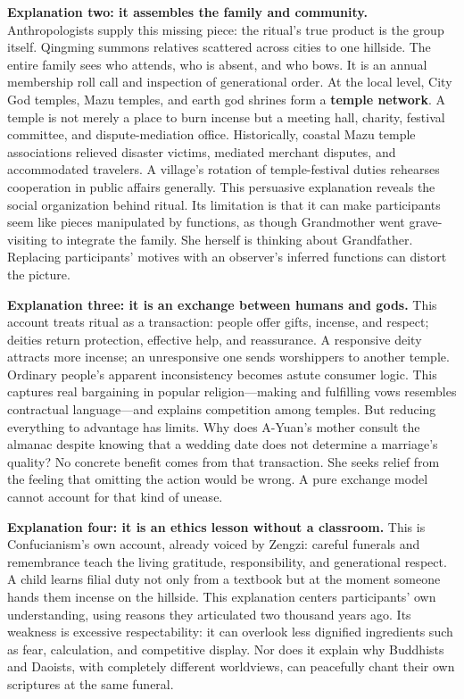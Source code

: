 \textbf{Explanation two: it assembles the family and community.} Anthropologists supply this missing piece: the ritual's true product is the group itself. Qingming summons relatives scattered across cities to one hillside. The entire family sees who attends, who is absent, and who bows. It is an annual membership roll call and inspection of generational order. At the local level, City God temples, Mazu temples, and earth god shrines form a \textbf{temple network}. A temple is not merely a place to burn incense but a meeting hall, charity, festival committee, and dispute-mediation office. Historically, coastal Mazu temple associations relieved disaster victims, mediated merchant disputes, and accommodated travelers. A village's rotation of temple-festival duties rehearses cooperation in public affairs generally. This persuasive explanation reveals the social organization behind ritual. Its limitation is that it can make participants seem like pieces manipulated by functions, as though Grandmother went grave-visiting to integrate the family. She herself is thinking about Grandfather. Replacing participants' motives with an observer's inferred functions can distort the picture.

\textbf{Explanation three: it is an exchange between humans and gods.} This account treats ritual as a transaction: people offer gifts, incense, and respect; deities return protection, effective help, and reassurance. A responsive deity attracts more incense; an unresponsive one sends worshippers to another temple. Ordinary people's apparent inconsistency becomes astute consumer logic. This captures real bargaining in popular religion---making and fulfilling vows resembles contractual language---and explains competition among temples. But reducing everything to advantage has limits. Why does A-Yuan's mother consult the almanac despite knowing that a wedding date does not determine a marriage's quality? No concrete benefit comes from that transaction. She seeks relief from the feeling that omitting the action would be wrong. A pure exchange model cannot account for that kind of unease.

\textbf{Explanation four: it is an ethics lesson without a classroom.} This is Confucianism's own account, already voiced by Zengzi: careful funerals and remembrance teach the living gratitude, responsibility, and generational respect. A child learns filial duty not only from a textbook but at the moment someone hands them incense on the hillside. This explanation centers participants' own understanding, using reasons they articulated two thousand years ago. Its weakness is excessive respectability: it can overlook less dignified ingredients such as fear, calculation, and competitive display. Nor does it explain why Buddhists and Daoists, with completely different worldviews, can peacefully chant their own scriptures at the same funeral.

